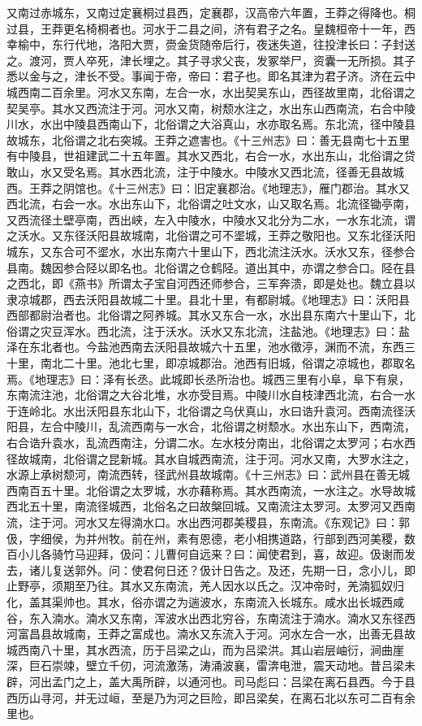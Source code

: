 \documentclass[12pt,UTF8]{ctexbook}
\begin{document}
又南过赤城东，又南过定襄桐过县西，定襄郡，汉高帝六年置，王莽之得降也。桐过县，王莽更名椅桐者也。河水于二县之间，济有君子之名。皇魏桓帝十一年，西幸榆中，东行代地，洛阳大贾，赍金货随帝后行，夜迷失道，往投津长曰：子封送之。渡河，贾人卒死，津长埋之。其子寻求父丧，发冢举尸，资囊一无所损。其子悉以金与之，津长不受。事闻于帝，帝曰：君子也。即名其津为君子济。济在云中城西南二百余里。河水又东南，左合一水，水出契吴东山，西径故里南，北俗谓之契吴亭。其水又西流注于河。河水又南，树颓水注之，水出东山西南流，右合中陵川水，水出中陵县西南山下，北俗谓之大浴真山，水亦取名焉。东北流，径中陵县故城东，北俗谓之北右突城。王莽之遮害也。《十三州志》曰：善无县南七十五里有中陵县，世祖建武二十五年置。其水又西北，右合一水，水出东山，北俗谓之贷敢山，水又受名焉。其水西北流，注于中陵水。中陵水又西北流，径善无县故城西。王莽之阴馆也。《十三州志》曰：旧定襄郡治。《地理志》，雁门郡治。其水又西北流，右会一水。水出东山下，北俗谓之吐文水，山又取名焉。北流径锄亭南，又西流径土壁亭南，西出峡，左入中陵水，中陵水又北分为二水，一水东北流，谓之沃水。又东径沃阳县故城南，北俗谓之可不埿城，王莽之敬阳也。又东北径沃阳城东，又东合可不埿水，水出东南六十里山下，西北流注沃水。沃水又东，径参合县南。魏因参合陉以即名也。北俗谓之仓鹤陉。道出其中，亦谓之参合口。陉在县之西北，即《燕书》所谓太子宝自河西还师参合，三军奔溃，即是处也。魏立县以隶凉城郡，西去沃阳县故城二十里。县北十里，有都尉城。《地理志》曰：沃阳县西部都尉治者也。北俗谓之阿养城。其水又东合一水，水出县东南六十里山下，北俗谓之灾豆浑水。西北流，注于沃水。沃水又东北流，注盐池。《地理志》曰：盐泽在东北者也。今盐池西南去沃阳县故城六十五里，池水徵渟，渊而不流，东西三十里，南北二十里。池北七里，即凉城郡治。池西有旧城，俗谓之凉城也，郡取名焉。《地理志》曰：泽有长丞。此城即长丞所治也。城西三里有小阜，阜下有泉，东南流注池，北俗谓之大谷北堆，水亦受目焉。中陵川水自枝津西北流，右合一水于连岭北。水出沃阳县东北山下，北俗谓之乌伏真山，水曰诰升袁河。西南流径沃阳县，左合中陵川，乱流西南与一水合，北俗谓之树颓水。水出东山下，西南流，右合诰升袁水，乱流西南注，分谓二水。左水枝分南出，北俗谓之太罗河；右水西径故城南，北俗谓之昆新城。其水自城西南流，注于河。河水又南，大罗水注之，水源上承树颓河，南流西转，径武州县故城南。《十三州志》曰：武州县在善无城西南百五十里。北俗谓之太罗城，水亦藉称焉。其水西南流，一水注之。水导故城西北五十里，南流径城西，北俗名之曰故槃回城。又南流注太罗河。太罗河又西南流，注于河。河水又左得湳水口。水出西河郡美稷县，东南流。《东观记》曰：郭伋，字细侯，为并州牧。前在州，素有恩德，老小相携道路，行部到西河美稷，数百小儿各骑竹马迎拜，伋问：儿曹何自远来？曰：闻使君到，喜，故迎。伋谢而发去，诸儿复送郭外。问：使君何日还？伋计日告之。及还，先期一日，念小儿，即止野亭，须期至乃往。其水又东南流，羌人因水以氏之。汉冲帝时，羌湳狐奴归化，盖其渠帅也。其水，俗亦谓之为遄波水，东南流入长城东。咸水出长城西咸谷，东入湳水。湳水又东南，浑波水出西北穷谷，东南流注于湳水。湳水又东径西河富昌县故城南，王莽之富成也。湳水又东流入于河。河水左合一水，出善无县故城西南八十里，其水西流，历于吕梁之山，而为吕梁洪。其山岩层岫衍，涧曲崖深，巨石崇竦，壁立千仞，河流激荡，涛涌波襄，雷渀电泄，震天动地。昔吕梁未辟，河出孟门之上，盖大禹所辟，以通河也。司马彪曰：吕梁在离石县西。今于县西历山寻河，并无过峘，至是乃为河之巨险，即吕梁矣，在离石北以东可二百有余里也。
\end{document}
